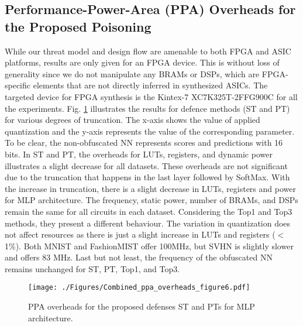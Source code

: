 \documentclass[10pt, twocolumn, conference]{IEEEtran}
\begin{document}
\subsection{Performance-Power-Area (PPA) Overheads for the Proposed Poisoning} \label{subsubsec:hardware_cost} 
While our threat model and design flow are amenable to both FPGA and ASIC platforms, results are only given for an FPGA device. This is without loss of generality since we do not manipulate any BRAMs or DSPs, which are FPGA-specific elements that are not directly inferred in synthesized ASICs. The targeted device for FPGA synthesis is the Kintex-7 XC7K325T-2FFG900C for all the experiments. Fig. \ref{fig:a1} illustrates the results for defence methods (ST and PT) for various degrees of truncation. The x-axis shows the value of applied quantization and the y-axis represents the value of the corresponding parameter. To be clear, the non-obfuscated NN represents scores and predictions with 16 bits. In ST and PT, the overheads for LUTs, registers, and dynamic power illustrates a slight decrease for all datasets. These overheads are not significant due to the truncation that happens in the last layer followed by SoftMax. With the increase in truncation, there is a slight decrease in LUTs, registers and power for MLP architecture. The frequency, static power, number of BRAMs, and DSPs remain the same for all circuits in each dataset. Considering the Top1 and Top3 methods, they present a different behaviour. The variation in quantization does not affect resources as there is just a slight increase in LUTs and registers ($<$1\%). Both MNIST and FashionMIST offer 100MHz, but SVHN is slightly slower and offers 83 MHz. Last but not least, the frequency of the obfuscated NN remains unchanged for ST, PT, Top1, and Top3.

\begin{figure}[t]
\centering \footnotesize
\texttt{[image: ./Figures/Combined\_ppa\_overheads\_figure6.pdf]}\vspace{-10pt}
\caption{PPA overheads for the proposed defenses ST and PTs for MLP architecture.}\vspace{-10pt}
\centering
\label{fig:a1}
\end{figure}

\end{document}
